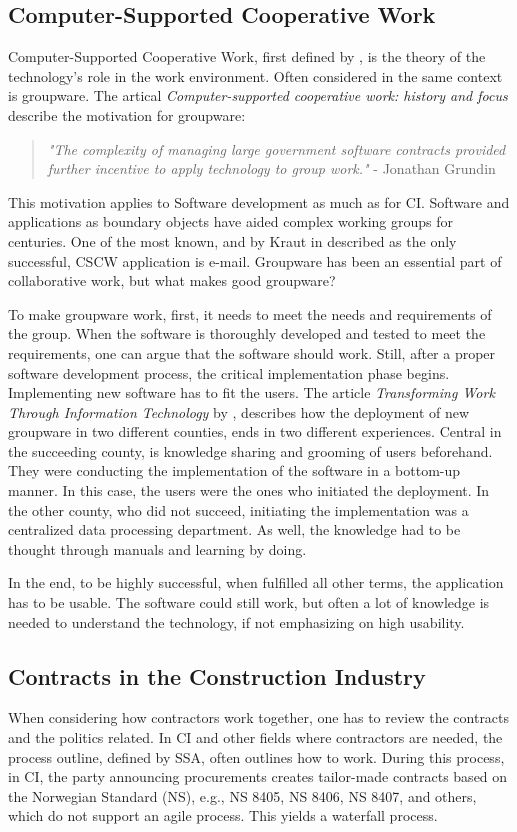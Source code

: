 \subsection{Computer-Supported Cooperative Work}
Computer-Supported Cooperative Work, first defined by \cite{Friedman}, is the theory of the technology's role in the work environment. Often considered in the same context is groupware. The artical \textit{Computer-supported cooperative work: history and focus} \cite{Grudin} describe the motivation for groupware: 
\begin{quotation}
    \noindent \textit{"The complexity of managing large government software contracts provided further incentive to apply technology to group work."} - Jonathan Grundin
\end{quotation}
This motivation applies to Software development as much as for CI. Software and applications as boundary objects have aided complex working groups for centuries. One of the most known, and by Kraut in \cite{Kraut} described as the only successful, CSCW application is e-mail. Groupware has been an essential part of collaborative work, but what makes good groupware? 

To make groupware work, first, it needs to meet the needs and requirements of the group. When the software is thoroughly developed and tested to meet the requirements, one can argue that the software should work. Still, after a proper software development process, the critical implementation phase begins. Implementing new software has to fit the users. The article \textit{Transforming Work Through Information Technology} by \cite{Robey&Sahay}, describes how the deployment of new groupware in two different counties, ends in two different experiences. Central in the succeeding county, is knowledge sharing and grooming of users beforehand. They were conducting the implementation of the software in a bottom-up manner. In this case, the users were the ones who initiated the deployment. In the other county, who did not succeed, initiating the implementation was a centralized data processing department. As well, the knowledge had to be thought through manuals and learning by doing.

In the end, to be highly successful, when fulfilled all other terms, the application has to be usable. The software could still work, but often a lot of knowledge is needed to understand the technology, if not emphasizing on high usability. 

\subsection{Contracts in the Construction Industry}
When considering how contractors work together, one has to review the contracts and the politics related. In CI and other fields where contractors are needed, the process outline, defined by SSA, often outlines how to work. During this process, in CI, the party announcing procurements creates tailor-made contracts based on the Norwegian Standard (NS), e.g., NS 8405, NS 8406, NS 8407, and others, which do not support an agile process. This yields a waterfall process. 

